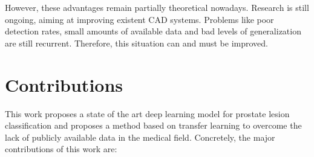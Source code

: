 However, these advantages remain partially theoretical nowadays. Research is still ongoing, aiming at improving existent CAD systems. Problems like poor detection rates, small amounts of available data and bad levels of generalization are still recurrent. Therefore, this situation can and must be improved. 




\section{Contributions}
This work proposes a state of the art deep learning model for prostate lesion classification and proposes a method based on transfer learning to overcome the lack of publicly available data in the medical field. Concretely, the major contributions of this work are:
